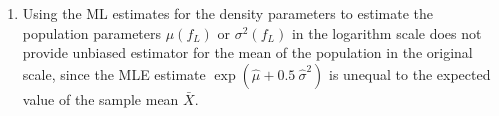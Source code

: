 \begin{enumerate}
    \item Using the ML estimates for the density parameters to estimate the population parameters $\mu( f _L )$ or $\sigma^2( f_L )$ in the logarithm scale does not provide unbiased estimator for the mean of the population in the original scale, since the MLE estimate $\exp( \hat{\mu} + 0.5 \ \hat{\sigma}^2)$ is unequal to the expected value of the sample mean $\bar{X}$.
    \hfill \cite{statistics/book/Statistics-for-Data-Scientists/Maurits-Kaptein}


\end{enumerate}


















